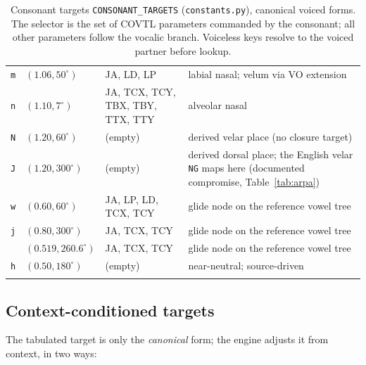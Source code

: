 \documentclass[11pt,a4paper]{article}
\newcommand{\turnh}{{\ipafont\symbol{"0265}}}
\begin{document}
\begin{longtable}{@{}llp{4.6cm}p{5.6cm}@{}}
\texttt{m}    & \((1.06, 50^\circ)\)   & JA, LD, LP & labial nasal; velum via VO extension \\
\texttt{n}    & \((1.10, 7^\circ)\)    & JA, TCX, TCY, TBX, TBY, TTX, TTY & alveolar nasal \\
\texttt{N}    & \((1.20, 60^\circ)\)   & (empty) & derived velar place (no closure target) \\
\texttt{J}    & \((1.20, 300^\circ)\)  & (empty) & derived dorsal place; the English velar \texttt{NG} maps here (documented compromise, Table~\ref{tab:arpa}) \\
\texttt{w}    & \((0.60, 60^\circ)\)   & JA, LP, LD, TCX, TCY & glide node on the reference vowel tree \\
\texttt{j}    & \((0.80, 300^\circ)\)  & JA, TCX, TCY & glide node on the reference vowel tree \\
\texttt{\turnh}    & \((0.519, 260.6^\circ)\) & JA, TCX, TCY & glide node on the reference vowel tree \\
\texttt{h}    & \((0.50, 180^\circ)\)  & (empty) & near-neutral; source-driven \\
\caption{Consonant targets \texttt{CONSONANT\_TARGETS}
(\texttt{constants.py}), canonical voiced forms. The selector is the set
of COVTL parameters commanded by the consonant; all other parameters
follow the vocalic branch. Voiceless keys resolve to the voiced partner
before lookup.}
\label{tab:cons}
\end{longtable}

\subsection{Context-conditioned targets}\label{subsec:context}

The tabulated target is only the \emph{canonical} form; the engine
adjusts it from context, in two ways:
\end{document}
